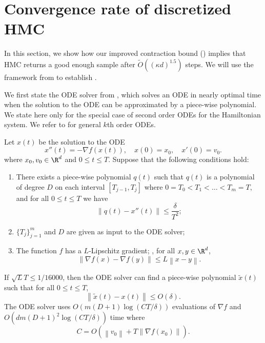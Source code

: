 \documentclass{toc}
\newcommand{\norm}[1]{\left\lVert #1 \right\rVert}
\newcommand{\grad}{\nabla}
\begin{document}
\section{Convergence rate of discretized HMC}
In this section, we show how our improved contraction bound () implies that HMC returns a good enough sample after $\tilde{O}((\kappa d)^{1.5})$ steps. We will use the framework from \cite{LSV18} to establish .

We first state the ODE solver from \cite{LSV18}, which solves an ODE in nearly optimal time when the solution to the ODE can be approximated by a piece-wise polynomial. We state here only for the special case of second order ODEs for the Hamiltonian system. We refer to \cite{LSV18} for general $k$th order ODEs.

\begin{theorem}
	\label{thm:ODE_solver}
	Let $x(t)$ be the solution to the ODE
	\begin{equation}
	x''(t) = -\grad f(x(t)), \quad x(0) = x_0, \quad x'(0) = v_0.
	\end{equation}
	where $x_0,v_0 \in \R^d$ and $0\le t\le T$. Suppose that the following conditions hold:
	\begin{enumerate}
		\item There exists a piece-wise polynomial $q(t)$ such that $q(t)$ is a polynomial of degree $D$ on each interval $[T_{j-1},T_j]$ where $0=T_0 < T_1 < \dots <T_m = T$, and for all $0\le t\le T$ we have
		\begin{equation}
		\norm{q(t) - x''(t)} \le \frac{\delta}{T^2};
		\end{equation}
		\item $\{T_j\}_{j=1}^m$ and $D$ are given as input to the ODE solver;
		\item The function $f$ has a $L$-Lipschitz gradient; \ie, for all $x,y\in\R^d$,
		\begin{equation}
		\norm{\grad f(x) - \grad f(y)} \le L \norm{x-y}.
		\end{equation}
	\end{enumerate}
	If $\sqrt{L} T \le 1/16000$, then the ODE solver can find a piece-wise polynomial $\tilde{x}(t)$ such that for all $0\le t\le T$,
	\begin{equation}
	\norm{\tilde{x}(t) - x(t)} \le O(\delta).
	\end{equation}
	The ODE solver uses $O(m(D+1) \log(CT/\delta))$ evaluations of $\grad f$ and $O(dm (D+1)^2 \log(CT/\delta))$ time where
	\begin{equation}
	C = O\left(\norm{v_0} + T\norm{\grad f(x_0)} \right).
	\end{equation}
\end{theorem}
\end{document}
